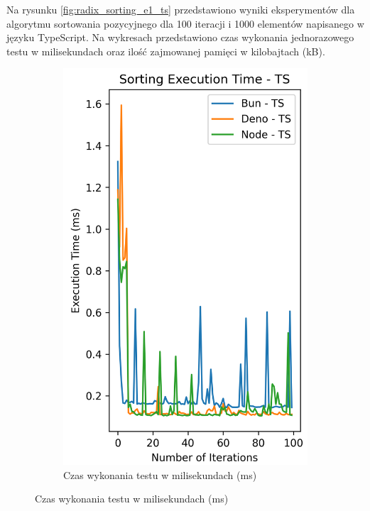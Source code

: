 Na rysunku \ref{fig:radix_sorting_e1_ts} przedstawiono wyniki eksperymentów dla algorytmu sortowania pozycyjnego dla 100 iteracji i 1000 elementów napisanego w języku TypeScript. Na wykresach przedstawiono czas wykonania jednorazowego testu w milisekundach oraz ilość zajmowanej pamięci w kilobajtach (kB).

\begin{figure}[H]
  \centering
  \begin{subfigure}[b]{0.42\textwidth}
    \centering
    \includegraphics[width=\textwidth]{Figures/sorting/sorting_radix_100_1000_ts_time.png}
    \caption{Czas wykonania testu w milisekundach (ms)}
    \label{fig:radix_sorting_e1_ts_time}

\end{subfigure}
\end{figure}
